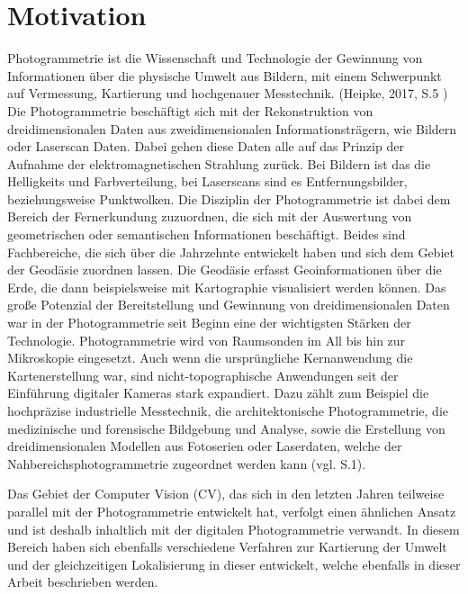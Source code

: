 \chapter{Motivation}

Photogrammetrie ist \glqq die Wissenschaft und Technologie der Gewinnung von Informationen
über die physische Umwelt aus Bildern, mit einem Schwerpunkt auf Vermessung,
Kartierung und hochgenauer Messtechnik\grqq{}. (Heipke, 2017, S.5 \cite{photo})  Die Photogrammetrie beschäftigt sich  mit der Rekonstruktion von dreidimensionalen Daten aus zweidimensionalen Informationsträgern, wie Bildern oder Laserscan Daten. Dabei gehen diese Daten alle auf das Prinzip der Aufnahme der elektromagnetischen Strahlung zurück. Bei Bildern ist das die Helligkeits und Farbverteilung, bei Laserscans sind es Entfernungsbilder, beziehungsweise Punktwolken. Die Disziplin der Photogrammetrie ist dabei dem Bereich der Fernerkundung zuzuordnen, die sich mit der Auswertung von geometrischen oder semantischen Informationen beschäftigt. Beides sind Fachbereiche, die sich über die Jahrzehnte entwickelt haben und sich dem Gebiet der Geodäsie zuordnen lassen. Die Geodäsie erfasst Geoinformationen über die Erde, die dann beispielsweise mit Kartographie visualisiert werden können. Das große Potenzial der Bereitstellung und Gewinnung von dreidimensionalen Daten war in der Photogrammetrie seit Beginn eine der wichtigsten Stärken der Technologie. Photogrammetrie wird von Raumsonden im All bis hin zur Mikroskopie eingesetzt. Auch wenn die ursprüngliche Kernanwendung die Kartenerstellung war, sind nicht-topographische Anwendungen seit der Einführung digitaler Kameras stark expandiert. Dazu zählt zum Beispiel die hochpräzise industrielle Messtechnik, die architektonische Photogrammetrie, die medizinische und forensische Bildgebung und Analyse, sowie die Erstellung von dreidimensionalen Modellen aus Fotoserien oder Laserdaten, welche der Nahbereichsphotogrammetrie zugeordnet werden kann (vgl. \cite{state_of_art} S.1).


Das Gebiet der Computer Vision (CV), das sich in den letzten Jahren teilweise parallel mit der Photogrammetrie entwickelt hat, verfolgt einen ähnlichen Ansatz und ist deshalb inhaltlich mit der digitalen Photogrammetrie verwandt. In diesem Bereich haben sich ebenfalls verschiedene Verfahren zur Kartierung der Umwelt und der gleichzeitigen Lokalisierung in dieser entwickelt, welche ebenfalls in dieser Arbeit beschrieben werden.  \\ \\

